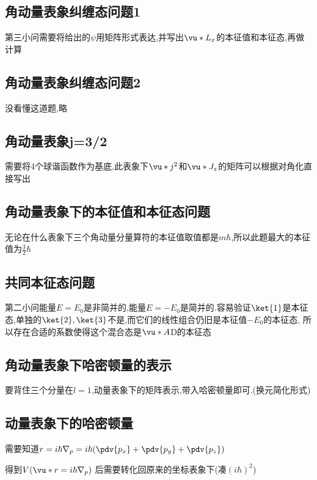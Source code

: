         \subsection{角动量表象纠缠态问题1}
            第三小问需要将给出的$\psi$用矩阵形式表达,并写出$\vu*{L}_{x}$的本征值和本征态,再做计算


        \subsection{角动量表象纠缠态问题2}
            没看懂这道题,略

        \subsection{角动量表象j=3/2}
            需要将4个球谐函数作为基底,此表象下$\vu*{j}^{2}$和$\vu*{J}_{z}$的矩阵可以根据对角化直接写出

        \subsection{角动量表象下的本征值和本征态问题}
            无论在什么表象下三个角动量分量算符的本征值取值都是$m\hbar$,所以此题最大的本征值为$\frac{3}{2}\hbar$
        
        \subsection{共同本征态问题}
            第二小问能量$E=E_{0}$是非简并的,能量$E=-E_{0}$是简并的.容易验证$\ket{1}$是本征态,单独的$\ket{2},\ket{3}$不是,而它们的线性组合仍旧是本征值$-E_{0}$的本征态,
            所以存在合适的系数使得这个混合态是$\vu*{A}$D的本征态
        
        \subsection{角动量表象下哈密顿量的表示}
            要背住三个分量在$l=1$,动量表象下的矩阵表示,带入哈密顿量即可.(换元简化形式)

        \subsection{动量表象下的哈密顿量}
            需要知道$r = i\hbar \nabla_{p} = i\hbar (\pdv{p_{x}} + \pdv{p_{y}} + \pdv{p_{z}} )$
            
            得到$ V(\vu*{r} = i\hbar \nabla_{p})$ 后需要转化回原来的坐标表象下(凑$(i\hbar)^{2}$)

